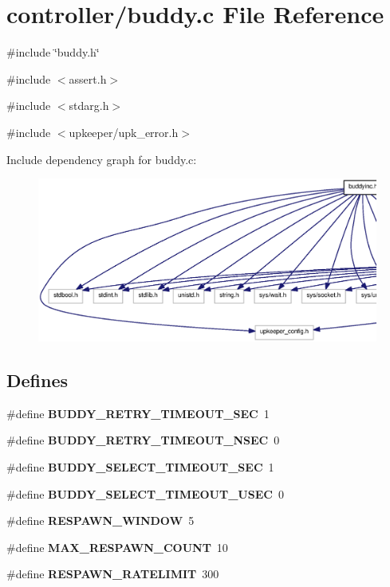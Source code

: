 \section{controller/buddy.c File Reference}
\label{buddy_8c}
{\ttfamily \#include \char`\"{}buddy.h\char`\"{}}\par
{\ttfamily \#include $<$assert.h$>$}\par
{\ttfamily \#include $<$stdarg.h$>$}\par
{\ttfamily \#include $<$upkeeper/upk\_\-error.h$>$}\par
Include dependency graph for buddy.c:
\nopagebreak
\begin{figure}[H]
\begin{center}
\leavevmode
\includegraphics[width=400pt]{buddy_8c__incl}
\end{center}
\end{figure}
\subsection*{Defines}
\begin{DoxyCompactItemize}
\item 
\#define {\bf BUDDY\_\-RETRY\_\-TIMEOUT\_\-SEC}~1
\item 
\#define {\bf BUDDY\_\-RETRY\_\-TIMEOUT\_\-NSEC}~0
\item 
\#define {\bf BUDDY\_\-SELECT\_\-TIMEOUT\_\-SEC}~1
\item 
\#define {\bf BUDDY\_\-SELECT\_\-TIMEOUT\_\-USEC}~0
\item 
\#define {\bf RESPAWN\_\-WINDOW}~5
\item 
\#define {\bf MAX\_\-RESPAWN\_\-COUNT}~10
\item 
\#define {\bf RESPAWN\_\-RATELIMIT}~300
\end{DoxyCompactItemize}
